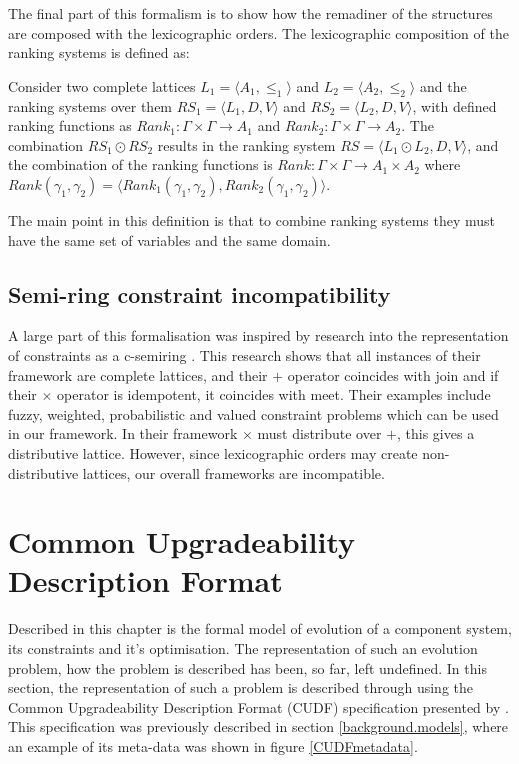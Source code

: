The final part of this formalism is to show how the remadiner of the structures are composed with the lexicographic orders.
The lexicographic composition of the ranking systems is defined as:
\begin{defs}
Consider two complete lattices $L_1 = \langle A_1, \leq_1 \rangle$ and $L_2 = \langle A_2,\leq_2 \rangle$ and
the ranking systems over them $RS_1 = \langle L_1,D,V \rangle $ and $RS_2 = \langle L_2,D,V \rangle$,
with defined ranking functions as $Rank_1: \Gamma \times \Gamma \rightarrow A_1 $ and $Rank_2: \Gamma \times \Gamma \rightarrow A_2$.
The combination $RS_1 \odot RS_2$  results in the ranking system 
$RS = \langle L_1 \odot L_2, D, V \rangle$, 
and the combination of the ranking functions is 
$Rank: \Gamma \times \Gamma \rightarrow A_1 \times A_2$ where $Rank(\gamma_1,\gamma_2) = \langle Rank_1(\gamma_1,\gamma_2), Rank_2(\gamma_1,\gamma_2) \rangle$.
\end{defs}

The main point in this definition is that to combine ranking systems they must have the same set of variables and the same domain.

\subsection{Semi-ring constraint incompatibility}
A large part of this formalisation was inspired by research into the representation of constraints as a c-semiring \cite{Bistarelli1997}.
This research shows that all instances of their framework are complete lattices, and their $+$ operator coincides with join
and if their $\times$ operator is idempotent, it coincides with meet.
Their examples include fuzzy, weighted, probabilistic and valued constraint problems which can be used in our framework.
In their framework $\times$ must distribute over $+$, this gives a distributive lattice.
However, since lexicographic orders may create non-distributive lattices, our overall frameworks are incompatible.

\section{Common Upgradeability Description Format}
\label{formal.cudf}
Described in this chapter is the formal model of evolution of a component system, its constraints and it's optimisation.
The representation of such an evolution problem, how the problem is described has been, so far, left undefined.
In this section, the representation of such a problem is described through using the Common Upgradeability Description Format (CUDF) specification presented by \cite{treinen2009common}.
This specification was previously described in section \ref{background.models}, where an example of its meta-data was shown in figure \ref{CUDFmetadata}.


